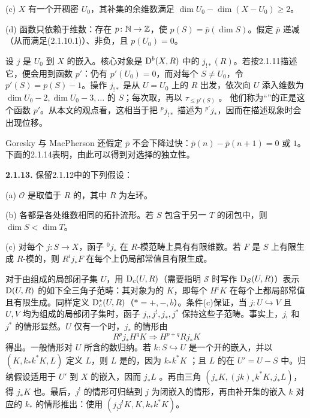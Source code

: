 (c) $X$ 有一个开稠密 $U_0$，其补集的余维数满足 $\dim U_0-\dim(X-U_0)\geq2$。

(d) 函数只依赖于维数：存在 $\relax p\colon\mathbb N\to\mathbb Z$，使 $p(S)=\bar p(\dim S)$。假定 $\bar p$ 递减（从而满足(2.1.10.1)）、非负，且 $p(U_0)=0$。

设 $j$ 是 $U_0$ 到 $X$ 的嵌入。核心对象是 $\mathrm{D}^b(X,R)$ 中的 $j_{!*}(R)$。若按2.1.11描述它，便会用到函数 $p'$：仍有 $p'(U_0)=0$，而对每个 $S\ne U_0$，令 $p'(S)=p(S)-1$。操作 $j_{!*}$ 是从 $U=U_0$ 上的 $R$ 出发，依次向 $U$ 添入维数为 $\dim U_0-2,\dim U_0-3,\ldots$ 的 $S$；每次取，再以 $\tau_{\leq p'(S)}$ 。
他们称为“”的正是这个函数 $p'$。从本文的观点看，这相当于把 ${}^pj_{!*}$ 描述为 ${}^{p'}j_*$，因而在描述现象时会出现位移。

Goresky 与 MacPherson 还假定 $\bar p$ 不会下降过快：$\bar p(n)-\bar p(n+1)=0$ 或 $1$。下面的2.1.14表明，由此可以得到对选择的独立性。

\par\medskip\noindent\textbf{2.1.13.} 保留2.1.12中的下列假设：

(a) $\mathcal O$ 是取值于 $R$ 的，其中 $R$ 为左环。

(b) 各都是各处维数相同的拓扑流形。若 $S$ 包含于另一 $T$ 的闭包中，则 $\dim S<\dim T$。

(c) 对每个 $j\colon S\to X$，函子 ${}^0j_*$ 在 $R$-模范畴上具有有限维数。若 $F$ 是 $S$ 上有限生成 $R$-模的，则 $R^ij_*F$ 在每个上仍局部常值且有限生成。

对于由组成的局部闭子集 $U$，用 $\mathrm{D}_c(U,R)$（需要指明 $\mathcal S$ 时写作 $\mathrm{D}_{\mathcal S}(U,R)$）表示 $\mathrm{D}(U,R)$ 的如下全三角子范畴：其对象为的 $K$，即每个 $H^iK$ 在每个上都局部常值且有限生成。同样定义 $\mathrm{D}_c^*(U,R)$（$*=+,-,b$）。条件(c)保证，当 $j\colon U\hookrightarrow V$ 且 $U,V$ 均为组成的局部闭子集时，函子 $j_!,j^!,j_*,j^*$ 保持这些子范畴。事实上，$j_!$ 和 $j^*$ 的情形显然。$U$ 仅有一个时，$j_*$ 的情形由
\[
 R^pj_*H^qK\Longrightarrow H^{p+q}Rj_*K
\]
得出。一般情形对 $U$ 所含的数归纳。若 $k\colon S\hookrightarrow U$ 是一个开的嵌入，并以 $(K,k_*k^*K,L)$ 定义 $L$，则 $L$ 是的，因为 $k_*k^*K$ ；且 $L$ 的在 $U'=U-S$ 中。归纳假设适用于 $U'$ 到 $X$ 的嵌入，因而 $j_*L$ 。再由三角 $(j_*K,(jk)_*k^*K,j_*L)$，得 $j_*K$ 也。最后，$j^!$ 的情形可归结到 $j$ 为闭嵌入的情形，再由补开集的嵌入 $k$ 对应的 $k_*$ 的情形推出：使用 $(j_!j^!K,K,k_*k^*K)$。


